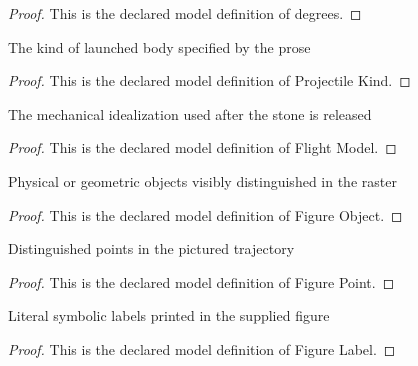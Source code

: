 \begin{proof}
  This is the declared model definition of degrees.
\end{proof}
\begin{definition}
  \label{def:physics:phyx-mini-0739:phyxminiproblems-problemphyxmini0739-projectilekind}
  The kind of launched body specified by the prose
\end{definition}
\begin{proof}
  This is the declared model definition of Projectile Kind.
\end{proof}
\begin{definition}
  \label{def:physics:phyx-mini-0739:phyxminiproblems-problemphyxmini0739-flightmodel}
  The mechanical idealization used after the stone is released
\end{definition}
\begin{proof}
  This is the declared model definition of Flight Model.
\end{proof}
\begin{definition}
  \label{def:physics:phyx-mini-0739:phyxminiproblems-problemphyxmini0739-figureobject}
  Physical or geometric objects visibly distinguished in the raster
\end{definition}
\begin{proof}
  This is the declared model definition of Figure Object.
\end{proof}
\begin{definition}
  \label{def:physics:phyx-mini-0739:phyxminiproblems-problemphyxmini0739-figurepoint}
  Distinguished points in the pictured trajectory
\end{definition}
\begin{proof}
  This is the declared model definition of Figure Point.
\end{proof}
\begin{definition}
  \label{def:physics:phyx-mini-0739:phyxminiproblems-problemphyxmini0739-figurelabel}
  Literal symbolic labels printed in the supplied figure
\end{definition}
\begin{proof}
  This is the declared model definition of Figure Label.
\end{proof}
